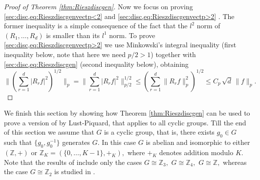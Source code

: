 \documentclass[leqno,12pt]{amsart}
\theoremstyle{definition}
\theoremstyle{remark}
\begin{document}
\begin{proof}[Proof of Theorem \ref{thm:Rieszdiscgen}]
Now we focus on proving \eqref{sec:disc,eq:Rieszdiscgenvectp<2} and \eqref{sec:disc,eq:Rieszdiscgenvectp>2} . The former inequality is a simple consequence of the fact that the $l^2$ norm of $(R_1,\ldots,R_d)$ is smaller than its $l^1$ norm. To prove \eqref{sec:disc,eq:Rieszdiscgenvectp>2} we use Minkowski's integral inequality (first inequality below, note that here we need $p/2>1$) together with \eqref{sec:disc,eq:Rieszdiscgen} (second inequality below), obtaining
\begin{equation*}
\bigg\|\left(\sum_{r=1}^d|R_r f|^2\right)^{1/2}\bigg\|_{p}=\bigg\|\sum_{r=1}^d|R_r f|^2\bigg\|^{1/2}_{p/2}\leq \left(\sum_{r=1}^d \|R_r f\|^2_{p}\right)^{1/2}\leq C_p\, \sqrt{d}\, \|f\|_{p}.
\end{equation*}
\end{proof}

We finish this section by showing how Theorem \ref{thm:Rieszdiscgen} can be used to prove a version of \cite[Theorem 2.8]{Lu_Piqu1} by Lust-Piquard, that applies to all cyclic groups. Till the end of this section we assume that $G$ is a cyclic group, that is, there exists $g_0\in G$ such that $\{g_0,g_0^{-1}\}$ generates $G.$
In this case $G$ is abelian and isomorphic to either $(\mathbb{Z},+)$ or $\mathbb{Z}_K=(\{0,\ldots,K-1\},+_{K}),$ where $+_{K}$ denotes addition modulo $K.$ Note that the results of \cite{Lu_Piqu1} include only the cases $G\cong \mathbb{Z}_3,$ $G\cong \mathbb{Z}_4,$ $G\cong \mathbb{Z},$ whereas the case $G\cong \mathbb{Z}_2$ is studied in \cite{Lu_Piqu2}.
\end{document}
